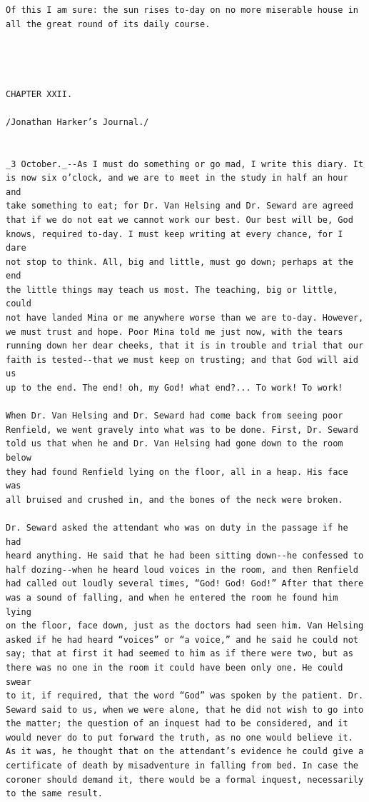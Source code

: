 \documentclass{article}
\begin{document}
\begin{verbatim}
Of this I am sure: the sun rises to-day on no more miserable house in
all the great round of its daily course.




CHAPTER XXII.

/Jonathan Harker’s Journal./


_3 October._--As I must do something or go mad, I write this diary. It
is now six o’clock, and we are to meet in the study in half an hour and
take something to eat; for Dr. Van Helsing and Dr. Seward are agreed
that if we do not eat we cannot work our best. Our best will be, God
knows, required to-day. I must keep writing at every chance, for I dare
not stop to think. All, big and little, must go down; perhaps at the end
the little things may teach us most. The teaching, big or little, could
not have landed Mina or me anywhere worse than we are to-day. However,
we must trust and hope. Poor Mina told me just now, with the tears
running down her dear cheeks, that it is in trouble and trial that our
faith is tested--that we must keep on trusting; and that God will aid us
up to the end. The end! oh, my God! what end?... To work! To work!

When Dr. Van Helsing and Dr. Seward had come back from seeing poor
Renfield, we went gravely into what was to be done. First, Dr. Seward
told us that when he and Dr. Van Helsing had gone down to the room below
they had found Renfield lying on the floor, all in a heap. His face was
all bruised and crushed in, and the bones of the neck were broken.

Dr. Seward asked the attendant who was on duty in the passage if he had
heard anything. He said that he had been sitting down--he confessed to
half dozing--when he heard loud voices in the room, and then Renfield
had called out loudly several times, “God! God! God!” After that there
was a sound of falling, and when he entered the room he found him lying
on the floor, face down, just as the doctors had seen him. Van Helsing
asked if he had heard “voices” or “a voice,” and he said he could not
say; that at first it had seemed to him as if there were two, but as
there was no one in the room it could have been only one. He could swear
to it, if required, that the word “God” was spoken by the patient. Dr.
Seward said to us, when we were alone, that he did not wish to go into
the matter; the question of an inquest had to be considered, and it
would never do to put forward the truth, as no one would believe it.
As it was, he thought that on the attendant’s evidence he could give a
certificate of death by misadventure in falling from bed. In case the
coroner should demand it, there would be a formal inquest, necessarily
to the same result.


\end{verbatim}
\end{document}
